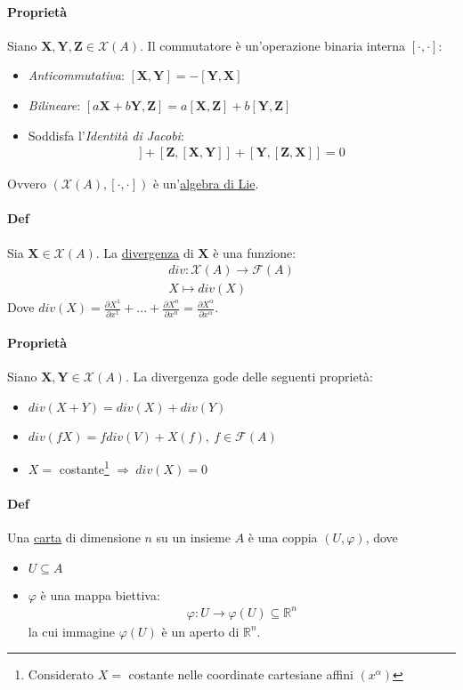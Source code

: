 \documentclass[10pt,a4paper]{book}
\begin{document}
    \paragraph{Proprietà} Siano $\mathbf{X},\mathbf{Y},\mathbf{Z}\in \mathcal{X}(A)$. Il commutatore è un'operazione binaria interna $[\cdot,\cdot]$:
    \begin{itemize}
        \item \textit{Anticommutativa}: $[\mathbf{X},\mathbf{Y}]=-[\mathbf{Y},\mathbf{X}]$
        \item \textit{Bilineare}:
    $[a\mathbf{X}+b\mathbf{Y},\mathbf{Z}]=a[\mathbf{X},\mathbf{Z}]+b[\mathbf{Y},\mathbf{Z}]$
    \item Soddisfa l'\textit{Identità di Jacobi}:
    \begin{align*}
        [\mathbf{X},[\mathbf{Y},\mathbf{Z}]]+[\mathbf{Z},[\mathbf{X},\mathbf{Y}]]+[\mathbf{Y},[\mathbf{Z},\mathbf{X}]]=0
    \end{align*}
    \end{itemize}
    Ovvero $(\mathcal{X}(A),[\cdot,\cdot])$ è un'\underline{algebra di Lie}.
\paragraph{Def} Sia $\mathbf{X}\in \mathcal{X}(A)$. La \underline{divergenza} di $\mathbf{X}$ è una funzione:
\begin{align*}div\colon\mathcal{X}(A)\to \mathcal{F}(A)\\
     X\mapsto div(X)
    \end{align*}
    Dove $div(X)=\frac{\partial X^1}{\partial x^1}+...+\frac{\partial X^n}{\partial x^n}=\frac{\partial X^\alpha}{\partial x^\alpha}$.

\paragraph{Proprietà} Siano $\mathbf{X},\mathbf{Y}\in \mathcal{X}(A)$. La divergenza gode delle seguenti proprietà:
\begin{itemize}
    \item $div(X+Y)=div(X)+div(Y)$
    \item $div(fX)=fdiv(V)+ X(f),\: f\in \mathcal{F}(A)$
    \item $X=$ costante\footnote{Considerato $X=$ costante nelle coordinate cartesiane affini $(x^\alpha)$} $\Rightarrow \: div(X)=0$
\end{itemize}
\paragraph{Def} Una \underline{carta} di dimensione $n$ su un insieme $A$ è una coppia $(U,\varphi)$, dove 
\begin{itemize}
    \item $U\subseteq A$  
    \item $\varphi$ è una mappa biettiva:
    \begin{align*}
        \varphi\colon U\to \varphi(U)\subseteq \mathbb{R}^n
    \end{align*}
    la cui immagine $\varphi(U)$ è un aperto di $\mathbb{R}^n$.
\end{itemize}
\end{document}
